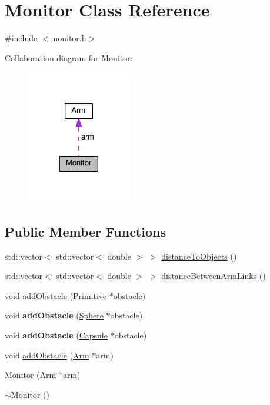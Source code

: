 \hypertarget{class_monitor}{}\section{Monitor Class Reference}
\label{class_monitor}


{\ttfamily \#include $<$monitor.\+h$>$}



Collaboration diagram for Monitor\+:\nopagebreak
\begin{figure}[H]
\begin{center}
\leavevmode
\includegraphics[width=129pt]{class_monitor__coll__graph}
\end{center}
\end{figure}
\subsection*{Public Member Functions}
\begin{DoxyCompactItemize}
\item 
std\+::vector$<$ std\+::vector$<$ double $>$ $>$ \hyperlink{class_monitor_a1801675787693435342ae799975b1120}{distance\+To\+Objects} ()
\item 
std\+::vector$<$ std\+::vector$<$ double $>$ $>$ \hyperlink{class_monitor_afe72152adc0d2d2faf8fb01563417033}{distance\+Between\+Arm\+Links} ()
\item 
void \hyperlink{class_monitor_a8c448bcff703af93489cc4f0847d4245}{add\+Obstacle} (\hyperlink{class_primitive}{Primitive} $\ast$obstacle)
\item 
void {\bfseries add\+Obstacle} (\hyperlink{class_sphere}{Sphere} $\ast$obstacle)\hypertarget{class_monitor_af5979d8f05c2d945ddc055e329fad5d2}{}\label{class_monitor_af5979d8f05c2d945ddc055e329fad5d2}

\item 
void {\bfseries add\+Obstacle} (\hyperlink{class_capsule}{Capsule} $\ast$obstacle)\hypertarget{class_monitor_a192497730489ebcd6a6580875cfbeee3}{}\label{class_monitor_a192497730489ebcd6a6580875cfbeee3}

\item 
void \hyperlink{class_monitor_a580dedf3090ffff7a452dbe32cc585f4}{add\+Obstacle} (\hyperlink{class_arm}{Arm} $\ast$arm)
\item 
\hyperlink{class_monitor_adda7d547e1226e159836356dd8af14bb}{Monitor} (\hyperlink{class_arm}{Arm} $\ast$arm)
\item 
\hyperlink{class_monitor_a64aba8195effc068092ddea5a71e8176}{$\sim$\+Monitor} ()
\end{DoxyCompactItemize}
